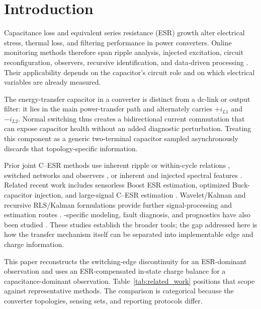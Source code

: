 \section{Introduction}
\label{sec:introduction}

Capacitance loss and equivalent series resistance (ESR) growth alter electrical stress, thermal loss, and filtering performance in power converters. Online monitoring methods therefore span ripple analysis, injected excitation, circuit reconfiguration, observers, recursive identification, and data-driven processing \cite{dang2020review,nathan2023review}. Their applicability depends on the capacitor's circuit role and on which electrical variables are already measured.

The energy-transfer capacitor in a \Cuk{} converter is distinct from a dc-link or output filter: it lies in the main power-transfer path and alternately carries $+i_{L1}$ and $-i_{L2}$. Normal switching thus creates a bidirectional current commutation that can expose capacitor health without an added diagnostic perturbation. Treating this component as a generic two-terminal capacitor sampled asynchronously discards that topology-specific information.

Prior joint C--ESR methods use inherent ripple or within-cycle relations \cite{hasegawa2018dclink,yao2015buck,tang2019sensorless}, switched networks and observers \cite{barbulescu2022observer,barbulescu2023implementation,caiman2024quasionline}, or inherent and injected spectral features \cite{ribeiro2025inherent,ribeiro2024injection,ribeiro2023wavelet}. Related recent work includes sensorless Boost ESR estimation, optimized Buck-capacitor injection, and large-signal C--ESR estimation \cite{leong2025boostesr,zhang2025injection,zhang2025largesignal}. Wavelet/Kalman and recursive RLS/Kalman formulations provide further signal-processing and estimation routes \cite{amaral2024waveletkf,zhang2025haar,reichbach2016rls,chen2018vffrls}. \Cuk{}-specific modeling, fault diagnosis, and prognostics have also been studied \cite{wang2021fractionalcuk,prathiba2023cuk,ajra2024sensorfault,samie2015prognostic}. These studies establish the broader tools; the gap addressed here is how the \Cuk{} transfer mechanism itself can be separated into implementable edge and charge information.

This paper reconstructs the switching-edge discontinuity for an ESR-dominant observation and uses an ESR-compensated in-state charge balance for a capacitance-dominant observation. Table~\ref{tab:related_work} positions that scope against representative methods. The comparison is categorical because the converter topologies, sensing sets, and reporting protocols differ.

